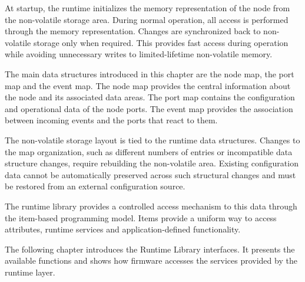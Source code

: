 At startup, the runtime initializes the memory representation of the node from the
non-volatile storage area. During normal operation, all access is performed through the
memory representation. Changes are synchronized back to non-volatile storage only when
required. This provides fast access during operation while avoiding unnecessary writes
to limited-lifetime non-volatile memory.

The main data structures introduced in this chapter are the node map, the port map and
the event map. The node map provides the central information about the node and its
associated data areas. The port map contains the configuration and operational data of
the node ports. The event map provides the association between incoming events and the
ports that react to them.

The non-volatile storage layout is tied to the runtime data structures. Changes to the
map organization, such as different numbers of entries or incompatible data structure
changes, require rebuilding the non-volatile area. Existing configuration data cannot be
automatically preserved across such structural changes and must be restored from an
external configuration source.

The runtime library provides a controlled access mechanism to this data through the
item-based programming model. Items provide a uniform way to access attributes,
runtime services and application-defined functionality.

The following chapter introduces the Runtime Library interfaces. It presents the
available functions and shows how firmware accesses the services provided by the
runtime layer.
